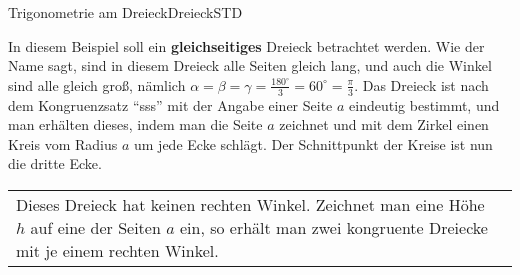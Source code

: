 \begin{MXContent}{Trigonometrie am Dreieck}{Dreieck}{STD}
\begin{MExample}%
In diesem Beispiel soll ein \textbf{gleichseitiges} Dreieck betrachtet werden. Wie der Name sagt, sind in diesem Dreieck alle Seiten gleich lang, und auch die Winkel sind alle gleich gro\ss , n\"amlich $\alpha=\beta=\gamma = \frac{180^\circ}{3} = 60^\circ = \frac{\pi}{3}$.
Das Dreieck ist nach dem Kongruenzsatz "`sss"' mit der Angabe einer Seite $a$ eindeutig bestimmt, und man erh\"alten dieses, indem man die Seite $a$ zeichnet und mit dem Zirkel einen Kreis vom Radius $a$ um jede Ecke schl\"agt. Der Schnittpunkt der Kreise ist nun die dritte Ecke.

\begin{tabular}{lr}
\begin{minipage}[b]{10.5cm}
Dieses Dreieck hat keinen rechten Winkel. Zeichnet man eine H\"ohe $h$ auf eine der Seiten $a$ ein, so erh\"alt man zwei kongruente Dreiecke mit je einem rechten Winkel.


\end{minipage}
\end{tabular}
\end{MExample}
\end{MXContent}
